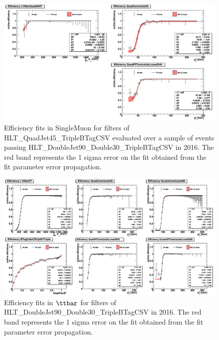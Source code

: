 \begin{figure}[htbp!]
\begin{center}
    \includegraphics[width=0.9\linewidth]{Figures/AnalysisStrategy/triggerfits/TriggerEfficiencies_2016_TTBarCut_SingleMuon_And_Fit_fullRange.png}
\end{center}
\caption[Efficiency fits in SingleMuon for filters in paths overlap in 2016]{Efficiency fits in SingleMuon for filters of HLT\_QuadJet45\_TripleBTagCSV evaluated over a sample of events passing HLT\_DoubleJet90\_Double30\_TripleBTagCSV in 2016. The red band represents the 1 sigma error on the fit obtained from the fit parameter error propagation.}
\label{trigger:fig:SingleMuonFilterEfficiency2016AndFit}
\end{figure}
    
\begin{figure}[htbp!]
\begin{center}
    \includegraphics[width=0.9\linewidth]{Figures/AnalysisStrategy/triggerfits/TriggerEfficiencies_2016_TTBarCut_TTbar_Double90Quad30_Fit_fullRange.png}
\end{center}
\caption[Efficiency fits in $\ttbar$ for filters of HLT\_DoubleJet90\_Double30\_TripleBTagCSV in 2016]{Efficiency fits in $\ttbar$ for filters of HLT\_DoubleJet90\_Double30\_TripleBTagCSV in 2016. The red band represents the 1 sigma error on the fit obtained from the fit parameter error propagation.}
\label{trigger:fig:TTbarFilterEfficiency2016DoubleFit}
\end{figure}

